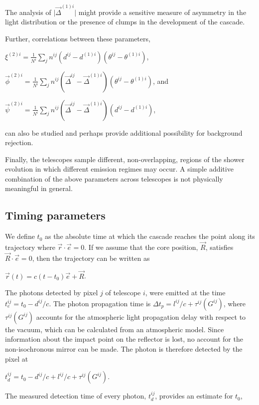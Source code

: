 \documentclass[letterpaper]{article}
\begin{document}
The analysis of $\vert\vec{\Delta}^{(1)i}\vert$ might provide a
sensitive measure of asymmetry in the light distribution or the
presence of clumps in the development of the cascade.

Further, correlations between these parameters,

$\displaystyle \xi^{(2)i} =
\frac{1}{N^i}\sum\limits_{j}n^{ij}(d^{ij}-d^{(1)i})(\theta^{ij}
-\theta^{(1)i})$,

$\displaystyle \vec{\phi}^{(2)i} =
\frac{1}{N^i}\sum\limits_{j}n^{ij}(\vec{\Delta}^{ij}
-\vec{\Delta}^{(1)i})(\theta^{ij}-\theta^{(1)i})$, and

$\displaystyle \vec{\psi}^{(2)i} =
\frac{1}{N^i}\sum\limits_{j}n^{ij}(\vec{\Delta}^{ij}
-\vec{\Delta}^{(1)i})(d^{ij}-d^{(1)i})$, 

can also be studied and perhaps provide additional possibility for 
background rejection.

Finally, the telescopes sample different, non-overlapping, regions of
the shower evolution in which different emission regimes may occur. A
simple additive combination of the above parameters across telescopes
is not physically meaningful in general.

\subsection{Timing parameters}

We define $t_0$ as the absolute time at which the cascade reaches the
point along its trajectory where $\vec{r}\cdot\vec{e}=0$. If we assume
that the core position, $\vec{R}$, satisfies $\vec{R}\cdot\vec{e}=0$,
then the trajectory can be written as

$\displaystyle \vec{r}(t)=c(t-t_0)\vec{e}+\vec{R}$.

The photons detected by pixel $j$ of telescope $i$, were emitted at
the time $t_e^{ij}=t_0-d^{ij}/c$. The photon propagation time is
$\Delta t_{p} = l^{ij}/c+\tau^{ij}(G^{ij})$, where $\tau^{ij}(G^{ij})$
accounts for the atmospheric light propagation delay with respect to
the vacuum, which can be calculated from an atmospheric model. Since
information about the impact point on the reflector is lost, no
account for the non-isochronous mirror can be made. The photon is
therefore detected by the pixel at

$\displaystyle t_d^{ij}=t_0-d^{ij}/c+l^{ij}/c+\tau^{ij}(G^{ij})$.

The measured detection time of every photon, $t_d^{ij}$, provides an
estimate for $t_0$, 
\end{document}

